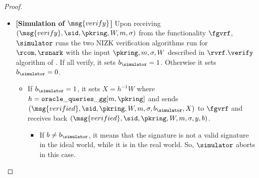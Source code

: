 \begin{proof}
\begin{itemize}
		
		\item \textbf{[Simulation of $ \msg{verify} $]} Upon receiving  $(\msg{verify}, \sid, \pkring,W, m, \sigma)$ from the functionality $\fgvrf$, $ \simulator $ runs the two NIZK verification algorithms run for $ \rcom, \rsnark $ with the input $ \pkring, m, \sigma, W $ described in $ \rvrf.\verify $ algorithm of \name. If  all verify, it sets $ b_{\simulator} =1 $. Otherwise it sets $ b_{\simulator} =0  $.
		
		\begin{itemize}
			\item 		If $ b_\simulator = 1 $, it sets $ X = h^{-1} W$ where $ h = \mathtt{oracle\_queries\_gg}[m, \pkring] $ and sends  $ (\msg{verified}, \sid, \pkring, W, m, \sigma, b_\simulator, X) $ to $ \fgvrf $ and receives back $ (\msg{verified}, \sid, \pkring, W, m, \sigma, y, b) $. 
			\begin{itemize}
				\item If $ b \neq b_\simulator $, it means that the signature is not a valid signature in the ideal world, while it is in the real world. So, $ \simulator $ aborts in this case.
				

\end{itemize}
\end{itemize}
\end{itemize}
\end{proof}

